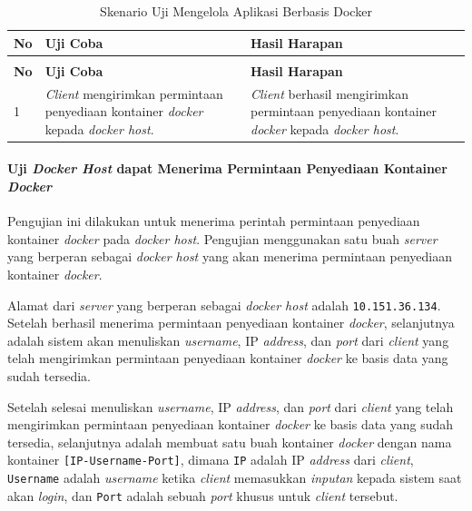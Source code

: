 \begin{longtable}{|p{}|p{}|p{}|}					\caption{Skenario Uji \textit{Client} dapat \textit{Login} Mengirimkan Permintaan Penyediaan Kontainer \textit{Docker}} \label{ujicoba2} \\
	\hline
	\textbf{No} & \textbf{Uji Coba} & \textbf{Hasil Harapan} \\ \hline
	\endfirsthead
	\caption[]{Skenario Uji Mengelola Aplikasi Berbasis Docker} \\
	\hline
	\textbf{No} & \textbf{Uji Coba} & \textbf{Hasil Harapan} \\ \hline
	\endhead
	\endfoot
	\endlastfoot
	
	1 & \textit{Client} mengirimkan permintaan penyediaan kontainer \textit{docker} kepada \textit{docker host}. & \textit{Client} berhasil mengirimkan permintaan penyediaan kontainer \textit{docker} kepada \textit{docker host}.\\ \hline
\end{longtable}

\paragraph{Uji \textit{Docker Host} dapat Menerima Permintaan Penyediaan Kontainer \textit{Docker}} \label{ketiga}
Pengujian ini dilakukan untuk menerima perintah permintaan penyediaan kontainer \textit{docker} pada \textit{docker host}. Pengujian menggunakan satu buah \textit{server} yang berperan sebagai \textit{docker host} yang akan menerima permintaan penyediaan kontainer \textit{docker}.

Alamat dari \textit{server} yang berperan sebagai \textit{docker host} adalah \texttt{10.151.36.134}. Setelah berhasil menerima permintaan penyediaan kontainer \textit{docker}, selanjutnya adalah sistem akan menuliskan \textit{username}, IP \textit{address}, dan \textit{port} dari \textit{client} yang telah mengirimkan permintaan penyediaan kontainer \textit{docker} ke basis data yang sudah tersedia.

Setelah selesai menuliskan \textit{username}, IP \textit{address}, dan \textit{port} dari \textit{client} yang telah mengirimkan permintaan penyediaan kontainer \textit{docker} ke basis data yang sudah tersedia, selanjutnya adalah membuat satu buah kontainer \textit{docker} dengan nama kontainer \texttt{[IP-Username-Port]}, dimana \texttt{IP} adalah IP \textit{address} dari \textit{client}, \texttt{Username} adalah \textit{username} ketika \textit{client} memasukkan \textit{inputan} kepada sistem saat akan \textit{login}, dan \texttt{Port} adalah sebuah \textit{port} khusus untuk \textit{client} tersebut.

